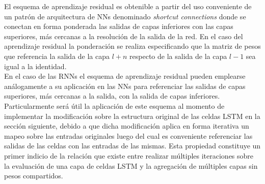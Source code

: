 \documentclass{article}
\begin{document}
	El esquema de aprendizaje residual es obtenible a partir del uso conveniente de un patrón de arquitectura de NNs denominado \textit{shortcut connections}\cite{29ShortcutConnections} donde se conectan en forma ponderada las salidas de capas inferiores con las capas superiores, más cercanas a la resolución de la salida de la red. En el caso del aprendizaje residual la ponderación se realiza especificando que la matriz de pesos que referencia la salida de la capa $l+n$ respecto de la salida de la capa $l-1$ sea igual a la identidad.\\
	
	En el caso de las RNNs el esquema de aprendizaje residual pueden emplearse análogamente a su aplicación en las NNs para referenciar las salidas de capas superiores, más cercanas a la salida, con la salida de capas inferiores.\\
	Particularmente será útil la aplicación de este esquema al momento de implementar la modificación sobre la estructura original de las celdas LSTM en la sección siguiente, debido a que dicha modificación aplica en forma iterativa un mapeo sobre las entradas originales luego del cual es conveniente referenciar las salidas de las celdas con las entradas de las mismas. Esta propiedad constituye un primer indicio de la relación que existe entre realizar múltiples iteraciones sobre la evaluación de una capa de celdas LSTM y la agregación de múltiples capas sin pesos compartidos.
	
\end{document}
